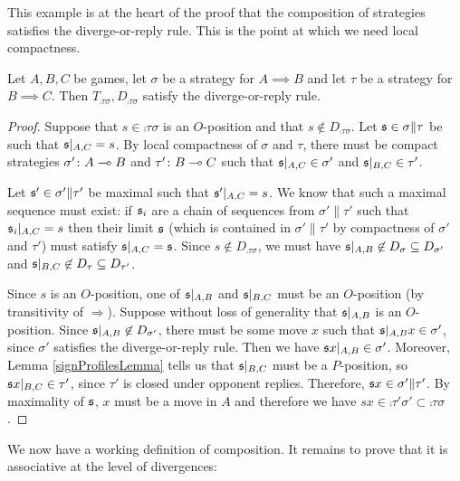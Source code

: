 \documentclass{article}
\begin{document}
This example is at the heart of the proof that the composition of strategies satisfies the diverge-or-reply rule.  This is the point at which we need local compactness.

\begin{proposition}
  Let $A,B,C$ be games, let $\sigma$ be a strategy for $A\implies B$ and let $\tau$ be a strategy for $B\implies C$.  Then $T_{\comp\tau\sigma}, D_{\comp\tau\sigma}$ satisfy the diverge-or-reply rule.

  \begin{proof}
    Suppose that $s\in\comp\tau\sigma$ is an $O$-position and that $s\not\in D_{\comp\tau\sigma}$.  Let $\mathfrak s\in\sigma\|\tau$ be such that $\mathfrak s\vert_{A,C}=s$.  By local compactness of $\sigma$ and $\tau$, there must be compact strategies $\sigma'\colon A\multimap B$ and $\tau'\colon B\multimap C$ such that $\mathfrak s\vert_{A,C}\in\sigma'$ and $\mathfrak s\vert_{B,C}\in\tau'$.  
    
    Let $\mathfrak s'\in\sigma'\|\tau'$ be maximal such that $\mathfrak s'\vert_{A,C}=s$.  We know that such a maximal sequence must exist: if $\mathfrak s_i$ are a chain of sequences from $\sigma'\|\tau'$ such that $\mathfrak s_i\vert_{A,C}=s$ then their limit $\mathfrak s$ (which is contained in $\sigma'\|\tau'$ by compactness of $\sigma'$ and $\tau'$) must satisfy $\mathfrak s\vert_{A,C}=\mathfrak s$.  Since $s\not\in D_{\comp\tau\sigma}$, we must have $\mathfrak s\vert_{A,B}\not\in D_\sigma\subseteq D_{\sigma'}$ and $\mathfrak s\vert_{B,C}\not\in D_\tau\subseteq D_{\tau'}$.  
    
    Since $s$ is an $O$-position, one of $\mathfrak s\vert_{A,B}$ and $\mathfrak s\vert_{B,C}$ must be an $O$-position (by transitivity of $\Rightarrow$).  Suppose without loss of generality that $\mathfrak s\vert_{A,B}$ is an $O$-position.  Since $\mathfrak s\vert_{A,B}\not\in D_{\sigma'}$, there must be some move $x$ such that $\mathfrak s\vert_{A,B}x\in\sigma'$, since $\sigma'$ satisfies the diverge-or-reply rule.  Then we have $\mathfrak s x\vert_{A,B}\in\sigma'$.  Moreover, Lemma \ref{signProfilesLemma} tells us that $\mathfrak s\vert_{B,C}$ must be a $P$-position, so $\mathfrak s x\vert_{B,C}\in\tau'$, since $\tau'$ is closed under opponent replies.  Therefore, $\mathfrak s x\in\sigma'\|\tau'$.  By maximality of $\mathfrak s$, $x$ must be a move in $A$ and therefore we have $sx\in\comp{\tau'}{\sigma'}\subset\comp\tau\sigma$.
  \end{proof}
\end{proposition}

We now have a working definition of composition.  It remains to prove that it is associative at the level of divergences:
\end{document}
